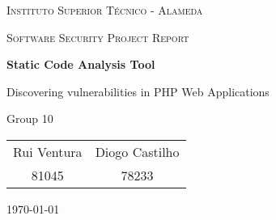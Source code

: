 \renewcommand*{\thepage}{0}
\begin{titlepage}
    \begin{center}
        {\Large\scshape Instituto Superior Técnico - Alameda\par}
        \vspace{2cm}
        
        {\large\scshape Software Security Project Report\par}
        \vspace{2cm}
        
        {\Huge\bfseries Static Code Analysis Tool\par}
        \vspace{0.2cm}
        
        {\Large Discovering vulnerabilities in PHP Web Applications\par}
        \vspace{2cm}
        
        {\large Group 10\par}
        \vspace{0.2cm}
        
        \begin{tabular}{c c}
            Rui Ventura & Diogo Castilho \\ [0.1cm]
            81045 & 78233 \\
        \end{tabular}

        \vfill
        
        {\large \today\par}
        \vspace{1cm}
    \end{center}
\end{titlepage}
\renewcommand*{\thepage}{\arabic{page}}